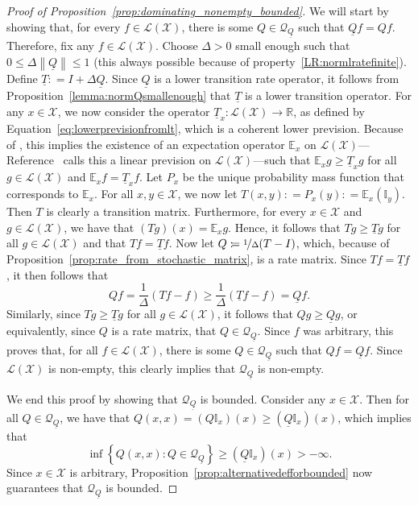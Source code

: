 \documentclass[10pt,a4paper]{paper}
\theoremstyle{definition}
\newcommand{\reals}{\mathbb{R}}
\newcommand{\states}{\mathcal{X}}
\newcommand{\lt}{\underline{T}}
\newcommand{\gambles}{\mathcal{L}}
\newcommand{\gamblesX}{\gambles(\states)}
\newcommand{\ind}[1]{\mathbb{I}_{#1}}
\newcommand{\rateset}{\mathcal{Q}}
\newcommand{\lrate}{\underline{Q}}
\newcommand{\norm}[1]{\left\lVert #1 \right\rVert}
\newcommand{\coloneqq}{:\!=}
\begin{document}
\begin{proof}[Proof of Proposition~\ref{prop:dominating_nonempty_bounded}]
We will start by showing that, for every $f\in\gamblesX$, there is some $Q\in\rateset_{\lrate}$ such that $\lrate f=Qf$. Therefore, fix any $f\in\gamblesX$. Choose $\Delta>0$ small enough such that $0\leq\Delta\norm{\lrate}\leq 1$ (this always possible because of property~\ref{LR:normlratefinite}). Define $\lt\coloneqq I+\Delta\lrate$. Since $\lrate$ is a lower transition rate operator, it follows from Proposition~\ref{lemma:normQsmallenough} that $\lt$ is a lower transition operator. For any $x\in\states$, we now consider the operator $\lt_x\colon\gamblesX\to\reals$, as defined by Equation~\eqref{eq:lowerprevisionfromlt}, which is a coherent lower prevision. Because of \cite[Theorem~3.3.3(b)]{Walley:1991vk}, this implies the existence of an expectation operator $\mathbb{E}_x$ on $\gamblesX$---Reference~\cite{Walley:1991vk} calls this a linear prevision on $\gamblesX$---such that $\mathbb{E}_xg\geq\lt_xg$ for all $g\in\gamblesX$ and $\mathbb{E}_xf=\lt_xf$. Let $P_x$ be the unique probability mass function that corresponds to $\mathbb{E}_x$. For all $x,y\in\states$, we now let $T(x,y)\coloneqq P_x(y)\coloneqq \mathbb{E}_x(\ind{y})$. Then $T$ is clearly a transition matrix. Furthermore, for every $x\in\states$ and $g\in\gamblesX$, we have that $(Tg)(x)=\mathbb{E}_xg$. Hence, it follows that $Tg\geq\lt g$ for all $g\in\gamblesX$ and that $Tf=\lt f$. Now let $Q\coloneqq\nicefrac{1}{\Delta}(T-I)$, which, because of Proposition~\ref{prop:rate_from_stochastic_matrix}, is a rate matrix. Since $Tf=\lt f$, it then follows that
\begin{equation*}
Qf=\frac{1}{\Delta}(Tf-f)\geq\frac{1}{\Delta}(\lt f-f)=\lrate f.
\end{equation*}
Similarly, since $Tg\geq\lt g$ for all $g\in\gamblesX$, it follows that $Qg\geq\lrate g$, or equivalently, since $Q$ is a rate matrix, that $Q\in\rateset_{\lrate}$. Since $f$ was arbitrary, this proves that, for all $f\in\gamblesX$, there is some $Q\in\rateset_{\lrate}$ such that $Qf=\lrate f$. Since $\gamblesX$ is non-empty, this clearly implies that $\rateset_{\lrate}$ is non-empty.

We end this proof by showing that $\rateset_{\lrate}$ is bounded. Consider any $x\in\states$. Then for all $Q\in\rateset_{\lrate}$, we have that $Q(x,x)=(Q\ind{x})(x)\geq(\lrate\ind{x})(x)$, which implies that
\begin{equation*}
\inf\left\{Q(x,x)\colon Q\in\rateset_{\lrate}\right\}\geq(\lrate\ind{x})(x)>-\infty.
\end{equation*}
Since $x\in\states$ is arbitrary, Proposition~\ref{prop:alternativedefforbounded} now guarantees that $\rateset_{\lrate}$ is bounded. 
\end{proof}
\end{document}
